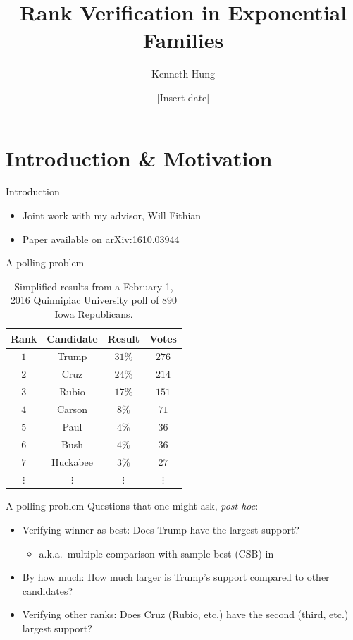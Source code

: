 \documentclass{beamer}
\title[Verifying Winner]{Rank Verification in Exponential Families}
\author[Kenneth Hung]{Kenneth Hung}
\institute[UC Berkeley]{
University of California, Berkeley \\
\medskip
\textit{kenhung@berkeley.edu}
}
\date{[Insert date]}
\begin{document}
\begin{frame}
\titlepage
\end{frame}

\section{Introduction \& Motivation}

\begin{frame}{Introduction}
\begin{itemize}
\item Joint work with my advisor, Will Fithian
\item Paper available on arXiv:1610.03944
\end{itemize}
\end{frame}

\begin{frame}{A polling problem}
\begin{table}[htbp]
\centering
\begin{tabular}{c c c c}
	\hline
	Rank & Candidate & Result & Votes \\
	\hline
	$1$ & Trump & $31\%$ & $276$ \\
	$2$ & Cruz & $24\%$ & $214$ \\
	$3$ & Rubio & $17\%$ & $151$ \\
	$4$ & Carson & $8\%$ & $71$ \\
	$5$ & Paul & $4\%$ & $36$ \\
	$6$ & Bush & $4\%$ & $36$ \\
	$7$ & Huckabee & $3\%$ & $27$ \\
	$\vdots$ & $\vdots$ & $\vdots $ & $\vdots$ \\
	\hline
\end{tabular}
\caption{Simplified results from a February 1, 2016 Quinnipiac University poll of $890$ Iowa Republicans.}
\label{tbl:poll}
\end{table}
\end{frame}

\begin{frame}{A polling problem}
Questions that one might ask, {\it post hoc}:
\begin{itemize}
\item Verifying winner as best: Does Trump have the largest support?
\begin{itemize}
\item a.k.a.\ multiple comparison with sample best (CSB) in \citet{Stefansson:1988wj}
\end{itemize}
\item By how much: How much larger is Trump's support compared to other candidates?
\item Verifying other ranks: Does Cruz (Rubio, etc.) have the second (third, etc.) largest support? 
\end{itemize}
\end{frame}
\end{document}
